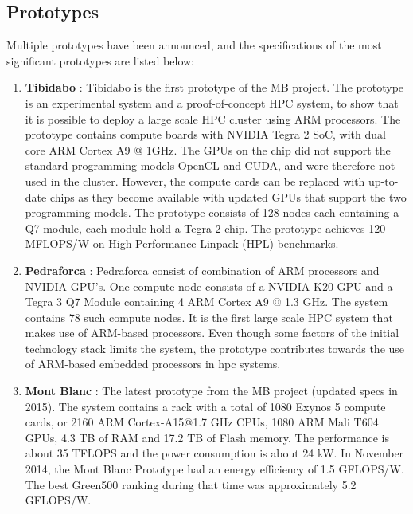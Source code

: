 \subsection{Prototypes}
Multiple prototypes have been announced, and the specifications of the most significant prototypes are listed below:
\begin{enumerate}
\item \textbf{Tibidabo} \cite{a:MB:Tib}: Tibidabo is the first prototype of the MB project. The prototype is an experimental system and a proof-of-concept HPC system, to show that it is possible to deploy a large scale HPC cluster using ARM processors. The prototype contains compute boards with NVIDIA Tegra 2 SoC, with dual core ARM Cortex A9 @ 1GHz. The GPUs on the chip did not support the standard programming models OpenCL and CUDA, and were therefore not used in the cluster. However, the compute cards can be replaced with up-to-date chips as they become available with updated GPUs that support the two programming models. The prototype consists of 128 nodes each containing a Q7 module, each module hold a Tegra 2 chip. The prototype achieves 120 MFLOPS/W on High-Performance Linpack (HPL) benchmarks.
\item \textbf{Pedraforca} \cite{m:MB:Pedr}: Pedraforca consist of combination of ARM processors and NVIDIA GPU's. One compute node consists of a NVIDIA K20 GPU and a Tegra 3 Q7 Module containing 4 ARM Cortex A9 @ 1.3 GHz. The system contains 78 such compute nodes. It is the first large scale HPC system that makes use of ARM-based processors. Even though some factors of the initial technology stack limits the system, the prototype contributes towards the use of ARM-based embedded processors in \gls{hpc} systems.
\item \textbf{Mont Blanc} \cite{m:MB:MB-prot}: The latest prototype from the MB project (updated specs in 2015\cite{m:MB-15}). The system contains a rack with a total of 1080 Exynos 5 compute cards, or  2160 ARM Cortex-A15@1.7 GHz CPUs, 1080 ARM Mali T604 GPUs, 4.3 TB of RAM and 17.2 TB of Flash memory. The performance is about 35 TFLOPS and the power consumption is about 24 kW. In November 2014, the Mont Blanc Prototype had an energy efficiency of 1.5 GFLOPS/W. The best Green500 ranking during that time was approximately 5.2 GFLOPS/W.
\end{enumerate}


